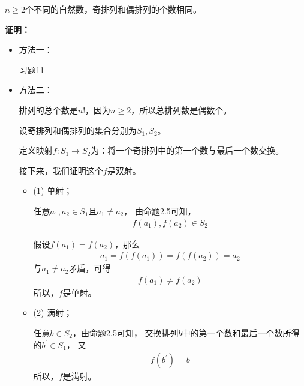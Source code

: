 \documentclass{article}
\begin{document}
\begin{zremark}
  $n \geq 2$个不同的自然数，奇排列和偶排列的个数相同。
\end{zremark}

\textbf{证明：}

\begin{itemize}
  \item 方法一：

        习题11

  \item 方法二：

        排列的总个数是$n!$，因为$n \geq 2$，所以总排列数是偶数个。

        设奇排列和偶排列的集合分别为$S_1, S_2$。

        定义映射$f : S_1 \rightarrow S_2$为：将一个奇排列中的第一个数与最后一个数交换。

        接下来，我们证明这个$f$是双射。

        \begin{itemize}
          \item (1) 单射；

                任意$a_1, a_2 \in S_1$且$a_1 \neq a_2$，
                由命题2.5可知，
                \begin{align*}
                  f(a_1), f(a_2) \in S_2
                \end{align*}

                假设$f(a_1) = f(a_2)$，那么
                \begin{align*}
                  a_1 = f(f(a_1)) = f(f(a_2)) = a_2
                \end{align*}
                与$a_1 \neq a_2$矛盾，可得
                \begin{align*}
                  f(a_1) \neq f(a_2)
                \end{align*}
                所以，$f$是单射。

          \item (2) 满射；

                任意$b \in S_2$，由命题2.5可知，
                交换排列$b$中的第一个数和最后一个数所得的$b^\prime \in S_1$，
                又
                \begin{align*}
                  f(b^\prime) = b
                \end{align*}
                所以，$f$是满射。
        \end{itemize}
\end{itemize}
\end{document}
